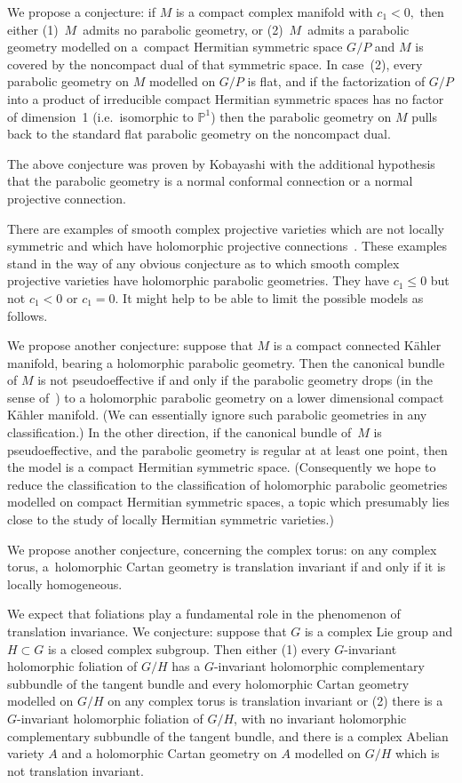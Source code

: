 \documentclass[pdftex]{sigma}
\newcommand{\Proj}[1]{\mathbb{P}^{#1}}
\newcommand{\Gtot}{\ensuremath{G}}
\newcommand{\Gstruc}{P}
\begin{document}
We propose a conjecture:
if $M$ is a compact complex manifold with $c_1<0,$ then either (1)~$M$~admits no parabolic geometry, or (2)~$M$~admits a parabolic
geometry modelled on a~compact Hermitian symmetric space
$\Gtot/\Gstruc$ and $M$ is covered by the
noncompact dual of that symmetric space. In case~(2), every
parabolic geometry on $M$ modelled on $\Gtot/\Gstruc$ is f\/lat,
and if the factorization of $G/P$ into a product of irreducible
compact Hermitian symmetric spaces has no factor of dimension~1
(i.e.\ isomorphic to $\Proj{1}$) then the parabolic geometry
on $M$ pulls back to the standard f\/lat parabolic geometry on
the noncompact dual.


The above conjecture was proven by Kobayashi \cite{Kobayashi/Horst:1983}
with the additional hypothesis
that the parabolic geometry is a normal conformal connection or a
normal projective connection.

There are examples of smooth complex projective varieties
which are not locally symmetric and which have holomorphic
projective connections~\cite{Jahnke/Radloff:2002}.
These examples stand in the way of any obvious conjecture
as to which smooth complex projective varieties have
holomorphic parabolic geometries. They have $c_1 \le 0$
but not $c_1 < 0$ or $c_1 = 0$. It might help
to be able to limit the possible models as follows.

We propose another conjecture:
suppose that $M$ is a compact connected K{\"a}hler manifold,
bearing a holomorphic parabolic geometry. Then
the canonical bundle of $M$ is not pseudoef\/fective
if and only if the parabolic geometry drops
(in the sense of~\cite{Biswas/McKay:2010c}) to a
holomorphic parabolic geometry on a lower
dimensional compact K{\"a}hler manifold.
(We can essentially ignore such parabolic
geometries in any classif\/ication.)
In the other direction, if the canonical bundle
of~$M$ is pseudoef\/fective, and the parabolic
geometry is regular at at least one point,
then the model is a compact Hermitian symmetric
space. (Consequently we hope to reduce the
classif\/ication to the classif\/ication of holomorphic
parabolic geometries modelled on compact Hermitian
symmetric spaces, a topic which presumably lies close
to the study of locally Hermitian symmetric varieties.)

We propose another conjecture, concerning the complex torus:
on any complex torus, a~holomorphic Cartan geometry
is translation invariant if and only if it is locally homogeneous.

We expect that foliations play a fundamental role in
the phenomenon of translation inva\-riance.
We conjecture:
suppose that $G$ is a complex Lie group and $H \subset G$
is a closed complex subgroup.
Then either (1) every $G$-invariant holomorphic foliation
of $G/H$ has a $G$-invariant holomorphic complementary subbundle
of the tangent bundle
and every holomorphic Cartan geometry modelled on $G/H$
on any complex torus is translation invariant
or (2) there is a~$G$-invariant holomorphic foliation of $G/H$,
with no invariant holomorphic complementary subbundle of the tangent
bundle, and there is a complex Abelian variety $A$ and
a holomorphic Cartan geometry on $A$ modelled on $G/H$
which is not translation invariant.
\end{document}
